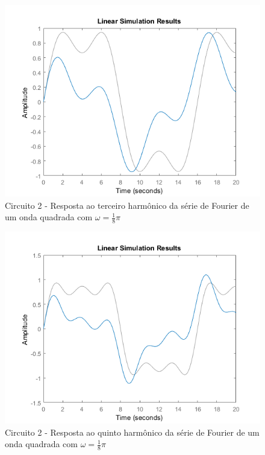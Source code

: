 \documentclass[a4paper, 12pt]{article}
\begin{document}
			\begin{figure}[!ht]
				\centering
				\includegraphics[scale=0.71]{img/1k_circ2.png}
				\caption{Circuito 2 - Resposta ao terceiro harmônico da série de Fourier de um onda quadrada com $\omega = \frac{1}{8}\pi$}	
			\end{figure}			
			\begin{figure}[!ht]
				\centering
				\includegraphics[scale=0.71]{img/1l_circ2.png}
				\caption{Circuito 2 - Resposta ao quinto harmônico da série de Fourier de um onda quadrada com $\omega = \frac{1}{8}\pi$}	
			\end{figure}		
		    \clearpage
\end{document}
